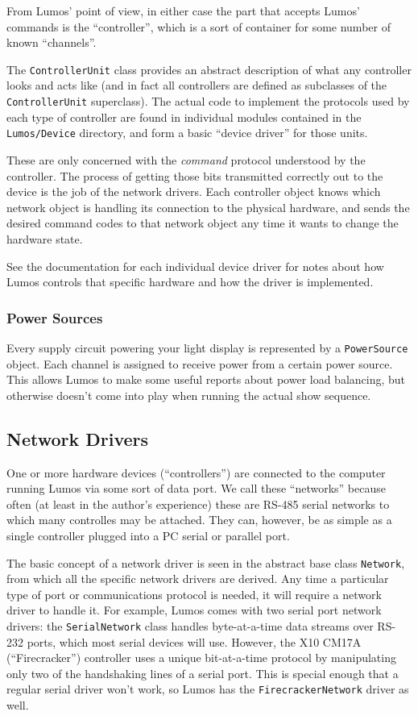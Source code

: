 \documentclass{article}
\begin{document}
From Lumos' point of view, in either case the part that accepts Lumos'
commands is the ``controller'', which is a sort of container for some
number of known ``channels''.  

The {\tt ControllerUnit} class provides an abstract description of what
any controller looks and acts like (and in fact all controllers are 
defined as subclasses of 
the {\tt ControllerUnit} superclass).  The actual code to implement the
protocols used by each type of controller are found in individual 
modules contained in the {\tt Lumos/Device} directory, and form a basic
``device driver'' for those units.  

These are only concerned with the
\emph{command} protocol understood by the controller.  The process of
getting those bits transmitted correctly out to the device is the job
of the network drivers.  Each controller object knows which network
object is handling its connection to the physical hardware, and sends
the desired command codes to that network object any time it wants to
change the hardware state.

See the documentation for each individual device driver for notes
about how Lumos controls that specific hardware and how the driver 
is implemented.

\subsubsection{Power Sources}
Every supply circuit powering your light display is represented by
a {\tt PowerSource} object.  Each channel is assigned to receive power
from a certain power source.  This allows Lumos to make some useful
reports about power load balancing, but otherwise doesn't come into
play when running the actual show sequence.

\subsection{Network Drivers}
One or more hardware devices (``controllers'') are connected to the
computer running Lumos via some sort of data port.  We call these
``networks'' because often (at least in the author's experience) these
are RS-485 serial networks to which many controlles may be attached.
They can, however, be as simple as a single controller plugged into a
PC serial or parallel port.

The basic concept of a network driver is seen in the abstract base class
{\tt Network}, from which all the specific network drivers are derived.
Any time a particular type of port or communications protocol is needed,
it will require a network driver to handle it.  For example, Lumos comes
with two serial port network drivers:  the {\tt SerialNetwork} class
handles byte-at-a-time data streams over RS-232 ports, which most serial
devices will use.  However, the X10 CM17A (``Firecracker'') controller
uses a unique bit-at-a-time protocol by manipulating only two of the
handshaking lines of a serial port.  This is special enough that a
regular serial driver won't work, so Lumos has the {\tt FirecrackerNetwork}
driver as well.
\end{document}
